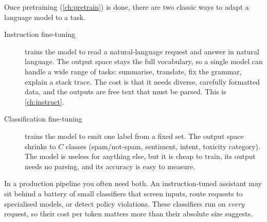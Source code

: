 Once pretraining (\cref{ch:pretrain}) is done, there are two classic ways to adapt a
language model to a task.

\begin{description}
\item[Instruction fine-tuning] trains the model to read a natural-language request and
answer in natural language. The output space stays the full vocabulary, so a single
model can handle a wide range of tasks: summarise, translate, fix the grammar, explain
a stack trace. The cost is that it needs diverse, carefully formatted data, and the
outputs are free text that must be parsed. This is \cref{ch:instruct}.
\item[Classification fine-tuning] trains the model to emit one label from a fixed set.
The output space shrinks to $C$ classes (spam/not-spam, sentiment, intent, toxicity
category). The model is useless for anything else, but it is cheap to train, its output
needs no parsing, and its accuracy is easy to measure.
\end{description}

In a production pipeline you often need both. An instruction-tuned assistant may sit
behind a battery of small classifiers that screen inputs, route requests to specialised
models, or detect policy violations. These classifiers run on \emph{every} request, so
their cost per token matters more than their absolute size suggests.

